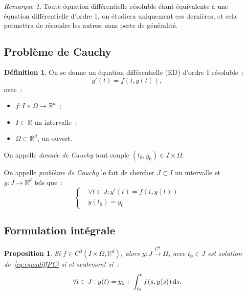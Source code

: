 \documentclass{report}
\newtheorem{prp}[thm]{Proposition}
\theoremstyle{definition}
\newtheorem{déf}[thm]{Définition}
\theoremstyle{remark}
\newtheorem*{rmq}{Remarque}
\numberwithin{equation}{section}
\newcommand{\R}{\mathbb R}
\newcommand{\toC}[1]{\xrightarrow{C^{#1}}}
\newcommand{\tocont}{\toC 0}
\begin{document}
			\begin{rmq} Toute équation différentielle résoluble étant équivalente à une équation différentielle d'ordre 1, on étudiera uniquement ces dernières,
			et cela permettra de résoudre les autres, sans perte de généralité.
			\end{rmq}

		\subsection{Problème de Cauchy}
			\begin{déf} On se donne un équation différentielle (ED) d'ordre 1 résoluble~:
			\begin{equation}
				y'(t) = f(t, y(t)),
			\end{equation}
			avec~:
			\begin{itemize}
				\item $f : I \times \Omega \to \R^d$~;
				\item $I \subset \R$ un intervalle~;
				\item $\Omega \subset \R^d$, un ouvert.
			\end{itemize}

			On appelle \textit{donnée de Cauchy} tout couple $(t_0, y_0) \in I \times \Omega$.

			On appelle \textit{problème de Cauchy} le fait de chercher $J \subset I$ un intervalle et $y : J \to \R^d$ tels que~:
			\begin{equation}\label{eq:equadiffPC}\tag{PC}
				\left\{\begin{aligned}
				&\forall t \in J : y'(t) = f(t, y(t)) \\
				&y(t_0) = y_0
			\end{aligned}\right.
			\end{equation}
			\end{déf}

		\subsection{Formulation intégrale}
			\begin{prp}\label{prp:PCintégrale} Si $f \in C^0(I \times \Omega, \R^d)$, alors $y : J \tocont \Omega$, avec $t_0 \in J$ est solution
			de~\eqref{eq:equadiffPC} si et seulement si~:
			\begin{equation}\label{eq:prppcintégrale}
				\forall t \in J : y(t) = y_0 + \int_{t_0}^tf(s, y(s))\dif s.
			\end{equation}
			\end{prp}
\end{document}

